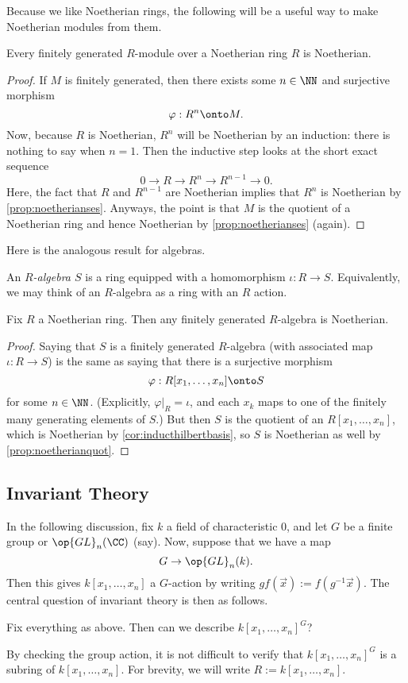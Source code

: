Because we like Noetherian rings, the following will be a useful way to make Noetherian modules from them.
\begin{proposition} \label{prop:fingennoetherian}
	Every finitely generated $R$-module over a Noetherian ring $R$ is Noetherian.
\end{proposition}
\begin{proof}
	If $M$ is finitely generated, then there exists some $n\in\NN$ and surjective morphism
	\[\varphi:R^n\onto M.\]
	Now, because $R$ is Noetherian, $R^n$ will be Noetherian by an induction: there is nothing to say when $n=1$. Then the inductive step looks at the short exact sequence
	\[0\to R\to R^n\to R^{n-1}\to 0.\]
	Here, the fact that $R$ and $R^{n-1}$ are Noetherian implies that $R^n$ is Noetherian by \autoref{prop:noetherianses}. Anyways, the point is that $M$ is the quotient of a Noetherian ring and hence Noetherian by \autoref{prop:noetherianses} (again).
\end{proof}
Here is the analogous result for algebras.
\begin{definition}[Algebra]
	An \textit{$R$-algebra $S$} is a ring equipped with a homomorphism $\iota:R\to S$. Equivalently, we may think of an $R$-algebra as a ring with an $R$ action.
\end{definition}
\begin{prop} \label{prop:fgalgebraisnoetherian}
	Fix $R$ a Noetherian ring. Then any finitely generated $R$-algebra is Noetherian.
\end{prop}
\begin{proof}
	Saying that $S$ is a finitely generated $R$-algebra (with associated map $\iota:R\to S$) is the same as saying that there is a surjective morphism
	\[\varphi:R[x_1,\ldots,x_n]\onto S\]
	for some $n\in\NN$. (Explicitly, $\varphi|_R=\iota$, and each $x_k$ maps to one of the finitely many generating elements of $S$.) But then $S$ is the quotient of an $R[x_1,\ldots,x_n]$, which is Noetherian by \autoref{cor:inducthilbertbasis}, so $S$ is Noetherian as well by \autoref{prop:noetherianquot}.
\end{proof}

\subsection{Invariant Theory}
In the following discussion, fix $k$ a field of characteristic $0$, and let $G$ be a finite group or $\op{GL}_n(\CC)$ (say). Now, suppose that we have a map
\[G\to\op{GL}_n(k).\]
Then this gives $k[x_1,\ldots,x_n]$ a $G$-action by writing $gf(\vec x):=f(g^{-1}\vec x).$ The central question of invariant theory is then as follows.
\begin{ques}
	Fix everything as above. Then can we describe $k[x_1,\ldots,x_n]^G$?
\end{ques}
By checking the group action, it is not difficult to verify that $k[x_1,\ldots,x_n]^G$ is a subring of $k[x_1,\ldots,x_n]$. For brevity, we will write $R:=k[x_1,\ldots,x_n]$.

